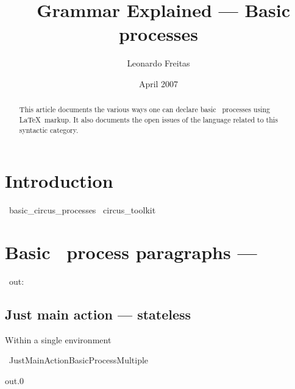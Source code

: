 \documentclass{article}
\begin{document}
\title{\Circus\ Grammar Explained --- Basic processes}
\author{Leonardo Freitas}
\date{April 2007}

\maketitle

\begin{abstract}
    \noindent This article documents the various ways one can declare basic \Circus\ processes using \LaTeX\ markup.
    It also documents the open issues of the language related to this syntactic category.
\end{abstract}

\section{Introduction}

\begin{zsection}
  \SECTION\ basic\_circus\_processes \parents\ circus\_toolkit
\end{zsection}

\section{Basic \Circus\ process paragraphs --- }

\begin{circus}
    \circchannel\ out: \nat
\end{circus}

\subsection{Just main action --- stateless}

Within a single environment
%
\begin{circus}
    \circprocess\ JustMainActionBasicProcessMultiple ~~\circdef~~ \circbegin
\end{circus}

\begin{circusaction}
    \circspot out.0 \then \Skip
\end{circusaction}
\end{document}
